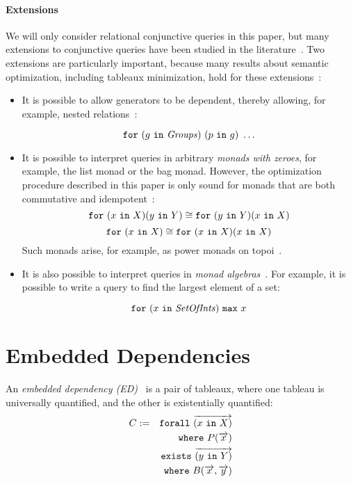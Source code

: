 \documentclass[preprint]{sigplanconf}
\newcommand{\FOR}{{\tt for}\relax\ifmmode\ \else\xspace\fi}
\newcommand{\FORALL}{{\tt forall}\relax\ifmmode\ \else\xspace\fi}
\newcommand{\EXISTS}{{\tt exists}\relax\ifmmode\ \else\xspace\fi}
\newcommand{\WHERE}{{\tt where}\relax\ifmmode\ \else\xspace\fi}
\newcommand{\IN}{ \ {\tt in} \ }
\newcommand{\relation}[1]{\ensuremath{\mathit{#1}}\xspace}
\begin{document}
\paragraph{Extensions}
We will only consider relational conjunctive queries in this paper, but many extensions to conjunctive queries have been studied in the literature~\cite{foundations}.  Two extensions are particularly important, because many results about semantic optimization, including tableaux minimization, hold for these extensions~\cite{Popa99anequational}:
\begin{itemize} 
\item  It is possible to allow generators to be dependent, thereby allowing, for example, nested relations~\cite{Popa99anequational}:
\begin{normalsize}
$$ \FOR (g \IN \relation{Groups}) \ (p \IN g) \ \ldots $$
\end{normalsize}
\item It is possible to interpret queries in arbitrary {\it monads with zeroes}, for example, the list monad or the bag monad.  However, the  optimization procedure described in this paper is only sound for monads that are both commutative and idempotent~\cite{Popa99anequational}:
$$
\FOR (x \IN X)(y \IN Y)  \cong \FOR (y \IN Y) (x \IN X) 
$$
$$
\FOR (x \IN X) \cong \FOR (x \IN X)(x \IN X) 
$$
Such monads arise, for example, as power monads on topoi~\cite{BW}.
\item It is also possible to interpret queries in {\it monad algebras}~\cite{755736}.  For example, it is possible to write a query to find the largest element of a set: 
\begin{normalsize}
$$ \FOR (x \IN \relation{SetOfInts}) \ {\tt max} \ x $$
\end{normalsize}

\end{itemize}

\section{Embedded Dependencies}
\label{sec:eds}

An {\it embedded dependency (ED)}~\cite{foundations} is a pair of tableaux, where one tableau is universally quantified, and the other is existentially quantified:
\begin{eqnarray*}
C & := & \FORALL \overrightarrow{(x \IN X)} \\
 & & \WHERE P(\overrightarrow{x}) \\
 & & \EXISTS \overrightarrow{(y \IN Y)} \\
 & & \WHERE B(\overrightarrow{x}, \overrightarrow{y})
\end{eqnarray*}
\end{document}
